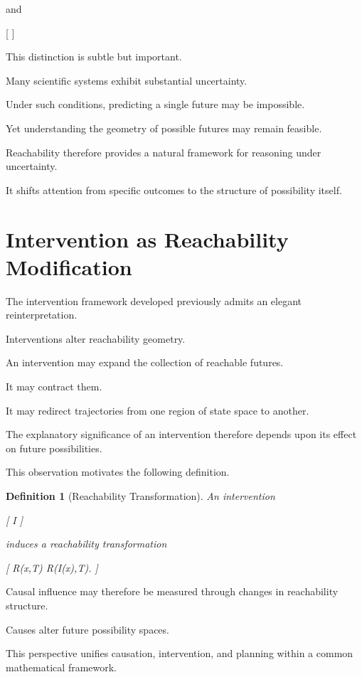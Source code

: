 \documentclass[11pt,oneside,openany]{book}
\newtheorem{definition}{Definition}[chapter] \newtheorem{theorem}{Theorem}[chapter] \newtheorem{proposition}{Proposition}[chapter] \newtheorem{lemma}{Lemma}[chapter] \newtheorem{corollary}{Corollary}[chapter] \newtheorem{remark}{Remark}[chapter]
\begin{document}
and

[
]

This distinction is subtle but important.

Many scientific systems exhibit substantial uncertainty.

Under such conditions, predicting a single future may be impossible.

Yet understanding the geometry of possible futures may remain feasible.

Reachability therefore provides a natural framework for reasoning under uncertainty.

It shifts attention from specific outcomes to the structure of possibility itself.

\section{Intervention as Reachability Modification}

The intervention framework developed previously admits an elegant reinterpretation.

Interventions alter reachability geometry.

An intervention may expand the collection of reachable futures.

It may contract them.

It may redirect trajectories from one region of state space to another.

The explanatory significance of an intervention therefore depends upon its effect on future possibilities.

This observation motivates the following definition.

\begin{definition}[Reachability Transformation]

An intervention

[
I
]

induces a reachability transformation

[
R(x,T)
\rightarrow
R(I(x),T).
]

\end{definition}

Causal influence may therefore be measured through changes in reachability structure.

Causes alter future possibility spaces.

This perspective unifies causation, intervention, and planning within a common mathematical framework.
\end{document}
